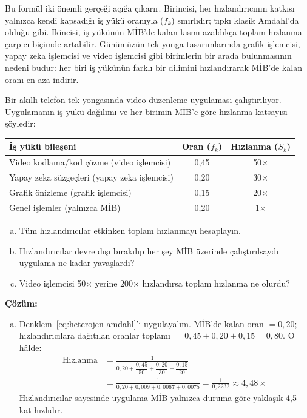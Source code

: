 Bu formül iki önemli gerçeği açığa çıkarır. Birincisi, her hızlandırıcının katkısı yalnızca kendi kapsadığı iş yükü oranıyla ($f_k$) sınırlıdır; tıpkı klasik Amdahl'da olduğu gibi. İkincisi, iş yükünün MİB'de kalan kısmı azaldıkça toplam hızlanma çarpıcı biçimde artabilir. Günümüzün tek yonga tasarımlarında grafik işlemcisi, yapay zeka işlemcisi ve video işlemcisi gibi birimlerin bir arada bulunmasının nedeni budur: her biri iş yükünün farklı bir dilimini hızlandırarak MİB'de kalan oranı en aza indirir.

\begin{ornek}[2.12]
Bir akıllı telefon tek yongasında video düzenleme uygulaması çalıştırılıyor. Uygulamanın iş yükü dağılımı ve her birimin MİB'e göre hızlanma katsayısı şöyledir:

\begin{center}
\small
\begin{tabular}{lcc}
\toprule
\textbf{İş yükü bileşeni} & \textbf{Oran ($f_k$)} & \textbf{Hızlanma ($S_k$)} \\
\midrule
Video kodlama/kod çözme (video işlemcisi) & 0,45 & 50$\times$ \\
Yapay zeka süzgeçleri (yapay zeka işlemcisi) & 0,20 & 30$\times$ \\
Grafik önizleme (grafik işlemcisi)          & 0,15 & 20$\times$ \\
Genel işlemler (yalnızca MİB)          & 0,20 & 1$\times$ \\
\bottomrule
\end{tabular}
\end{center}

\begin{enumerate}[(a)]
    \item Tüm hızlandırıcılar etkinken toplam hızlanmayı hesaplayın.
    \item Hızlandırıcılar devre dışı bırakılıp her şey MİB üzerinde çalıştırılsaydı uygulama ne kadar yavaşlardı?
    \item Video işlemcisi 50$\times$ yerine 200$\times$ hızlandırsa toplam hızlanma ne olurdu?
\end{enumerate}

\textbf{Çözüm:}
\begin{enumerate}[(a)]
    \item Denklem~\ref{eq:heterojen-amdahl}'i uygulayalım. MİB'de kalan oran $= 0{,}20$; hızlandırıcılara dağıtılan oranlar toplamı $= 0{,}45 + 0{,}20 + 0{,}15 = 0{,}80$. O hâlde:
    \begin{align*}
    \text{Hızlanma} &= \frac{1}{0{,}20 + \dfrac{0{,}45}{50} + \dfrac{0{,}20}{30} + \dfrac{0{,}15}{20}} \\[6pt]
    &= \frac{1}{0{,}20 + 0{,}009 + 0{,}0067 + 0{,}0075}
    = \frac{1}{0{,}2232}
    \approx 4{,}48\times
    \end{align*}
    Hızlandırıcılar sayesinde uygulama MİB-yalnızca duruma göre yaklaşık 4,5 kat hızlıdır.


\end{enumerate}
\end{ornek}
